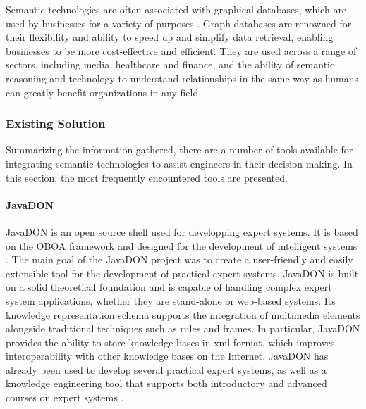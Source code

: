             Semantic technologies are often associated with graphical databases, which are used by businesses for a variety of purposes \cite{eshach2003case}. Graph databases are renowned for their flexibility and ability to speed up and simplify data retrieval, enabling businesses to be more cost-effective and efficient. They are used across a range of sectors, including media, healthcare and finance, and the ability of semantic reasoning and technology to understand relationships in the same way as humans can greatly benefit organizations in any field.\\
        
        \subsubsection{Existing Solution\label{sec:exonto}}
        Summarizing the information gathered, there are a number of tools available for integrating semantic technologies to assist engineers in their decision-making. In this section, the most frequently encountered tools are presented.
        
            \paragraph{JavaDON}
            JavaDON is an open source shell used for developping expert systems. It is based on the OBOA framework and designed for the development of intelligent systems \cite{jovanovic2005achieving}. The main goal of the JavaDON project was to create a user-friendly and easily extensible tool for the development of practical expert systems. JavaDON is built on a solid theoretical foundation and is capable of handling complex expert system applications, whether they are stand-alone or web-based systems. Its knowledge representation schema supports the integration of multimedia elements alongside traditional techniques such as rules and frames. In particular, JavaDON provides the ability to store knowledge bases in \acrshort{xml} format, which improves interoperability with other knowledge bases on the Internet. JavaDON has already been used to develop several practical expert systems, as well as a knowledge engineering tool that supports both introductory and advanced courses on expert systems \cite{tomic2006javadon}.
        
